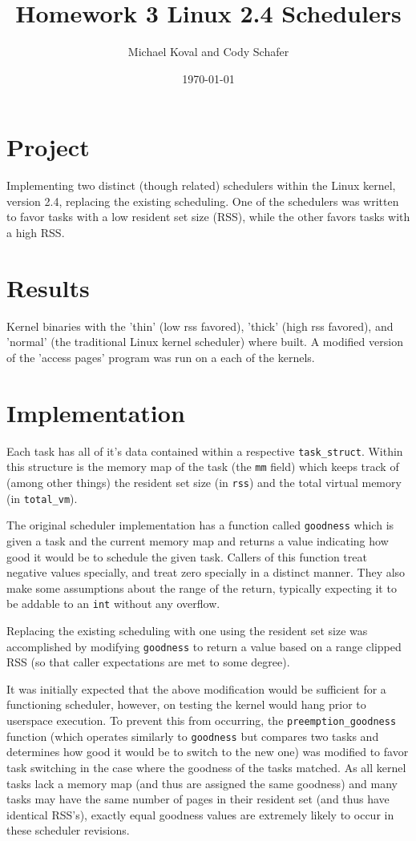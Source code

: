 \documentclass[10pt]{article}
\title{\textbf{Homework 3}
Linux 2.4 Schedulers}
\author{Michael Koval and Cody Schafer}
\date{\today}
\begin{document}
\maketitle

\section{Project}

Implementing two distinct (though related) schedulers within the Linux
kernel, version 2.4, replacing the existing scheduling. One of the
schedulers was written to favor tasks with a low resident set size (RSS),
while the other favors tasks with a high RSS.

\section{Results}

Kernel binaries with the 'thin' (low rss favored), 'thick'  (high rss
favored), and 'normal' (the traditional Linux kernel scheduler) where
built. A modified version of the 'access pages' program was run on a
each of the kernels. 

\section{Implementation}

Each task has all of it's data contained within a respective
\texttt{task\_struct}. Within this structure is the memory map of the task
(the \texttt{mm} field) which keeps track of (among other things) the
resident set size (in \texttt{rss}) and the total virtual memory (in
\texttt{total\_vm}).

The original scheduler implementation has a function called
\texttt{goodness} which is given a task and the current memory map and
returns a value indicating how good it would be to schedule the given
task. Callers of this function treat negative values specially, and treat
zero specially in a distinct manner. They also make some assumptions about
the range of the return, typically expecting it to be addable to an
\texttt{int} without any overflow.

Replacing the existing scheduling with one using the resident set size
was accomplished by modifying \texttt{goodness} to return a value based on
a range clipped RSS (so that caller expectations are met to some degree).

It was initially expected that the above modification would be sufficient
for a functioning scheduler, however, on testing the kernel would hang
prior to userspace execution. To prevent this from occurring, the
\texttt{preemption\_goodness} function (which operates similarly to
\texttt{goodness} but compares two tasks and determines how good it would
be to switch to the new one) was modified to favor task switching in the
case where the goodness of the tasks matched. As all kernel tasks lack a
memory map (and thus are assigned the same goodness) and many tasks may
have the same number of pages in their resident set (and thus have
identical RSS's), exactly equal goodness values are extremely likely to
occur in these scheduler revisions.
\end{document}

